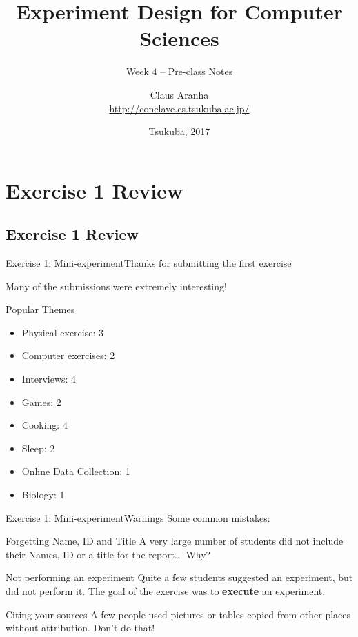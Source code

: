 \documentclass[t]{beamer}
\title[]{Experiment Design for Computer Sciences}
\subtitle[]{Week 4 -- Pre-class Notes}
\author[]{Claus Aranha\\{\footnotesize \url{http://conclave.cs.tsukuba.ac.jp/}}}
\institute{Computer Science Department}
\date{\scriptsize Tsukuba, 2017}
\begin{document}
\section{Exercise 1 Review}
\subsection{Exercise 1 Review}
\begin{frame}
  \titlepage
\end{frame}

\begin{ftst}
  {Exercise 1: Mini-experiment}{Thanks for submitting the first exercise}

  Many of the submissions were extremely interesting!

  \bigskip
  
  \begin{block}{Popular Themes}
    \begin{itemize}
    \item Physical exercise: 3
    \item Computer exercises: 2
    \item Interviews: 4
    \item Games: 2
    \item Cooking: 4
    \item Sleep: 2
    \item Online Data Collection: 1
    \item Biology: 1
    \end{itemize}
  \end{block}
\end{ftst}

\begin{ftst}
  {Exercise 1: Mini-experiment}{Warnings}
  Some common mistakes:
  \medskip
  
  \begin{block}{Forgetting Name, ID and Title}
    A very large number of students did not include their Names, ID or
    a title for the report... Why?
  \end{block}

  \begin{block}{Not performing an experiment}
    Quite a few students suggested an experiment, but did not perform
    it. The goal of the exercise was to {\bf execute} an experiment.
  \end{block}

  \begin{block}{Citing your sources}
    A few people used pictures or tables copied from other places
    without attribution. \alert{Don't do that!}
  \end{block}

\end{ftst}
\end{document}
